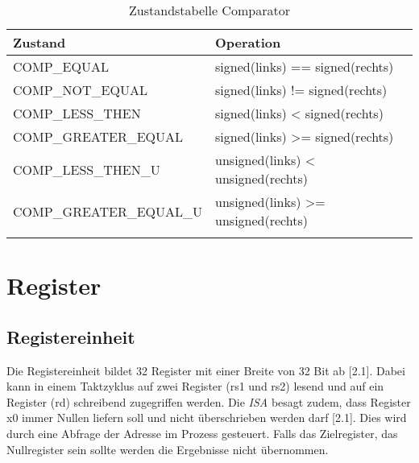             \begin{center}
                \begin{longtable}{| l | l | }
                    \hline
                        Zustand & Operation \\
                    \hline
                        COMP\_EQUAL & signed(links) == signed(rechts) \\
                    \hline
                        COMP\_NOT\_EQUAL & signed(links) != signed(rechts) \\
                    \hline
                        COMP\_LESS\_THEN & signed(links) < signed(rechts) \\
                    \hline
                        COMP\_GREATER\_EQUAL & signed(links) >= signed(rechts) \\
                    \hline
                        COMP\_LESS\_THEN\_U & unsigned(links) < unsigned(rechts) \\
                    \hline
                        COMP\_GREATER\_EQUAL\_U & unsigned(links) >= unsigned(rechts) \\
                    \hline
                    \caption[Zustandstabelle Comparator]{Zustandstabelle Comparator}
                    \label{tab:comp-states}
                \end{longtable}
            \end{center}
                


    \section{Register}

        \subsection{Registereinheit} 
            Die Registereinheit bildet 32 Register mit einer Breite von 32 Bit ab \cite{riscv-isa-specs}[2.1].
            Dabei kann in einem Taktzyklus auf zwei Register (rs1 und rs2) lesend und auf ein Register (rd) schreibend zugegriffen werden.
            Die \textit{ISA} besagt zudem, dass Register x0 immer Nullen liefern soll und nicht überschrieben werden darf \cite{riscv-isa-specs}[2.1].
            Dies wird durch eine Abfrage der Adresse im Prozess gesteuert. Falls das Zielregister, das Nullregister sein sollte werden die Ergebnisse
            nicht übernommen.
            

